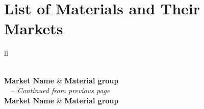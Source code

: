 \documentclass{article}
\begin{document}
\section{List of Materials and Their Markets}

\begin{longtable}{ll}
    \caption{A comprehensive list of various materials in the default configuration.} \label{tab:materials} \\
    \toprule
    \textbf{Market Name} & \textbf{Material group} \\
    \midrule
    \endfirsthead
    {\tablename\ \thetable\ -- \textit{Continued from previous page}} \\
    \toprule
    \textbf{Market Name} & \textbf{Material group} \\
    \midrule
    \endhead
    \midrule {} \\
    \endfoot
    \bottomrule
    \endlastfoot


\end{longtable}
\end{document}
